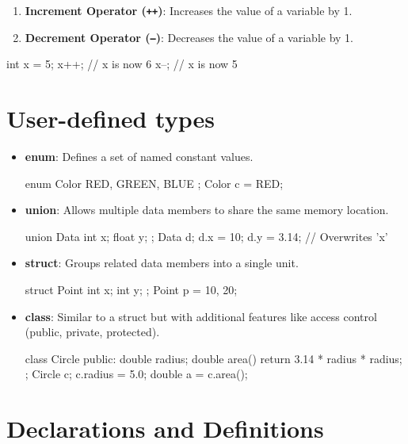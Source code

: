 \begin{enumerate}
    \item \textbf{Increment Operator (\texttt{++})}: Increases the value of a variable by 1.
    \item \textbf{Decrement Operator (\texttt{--})}: Decreases the value of a variable by 1.
\end{enumerate}

\begin{codeblock}[language=C++]
int x = 5;
x++; // x is now 6
x--; // x is now 5
\end{codeblock}

\section{User-defined types}

\begin{itemize}
    \item \textbf{enum}: Defines a set of named constant values.
    \begin{codeblock}[language=C++]
enum Color { RED, GREEN, BLUE };
Color c = RED;
    \end{codeblock}
    \item \textbf{union}: Allows multiple data members to share the same memory location.
    \begin{codeblock}[language=C++]
union Data {
    int x;
    float y;
};
Data d;
d.x = 10;
d.y = 3.14; // Overwrites 'x'
    \end{codeblock}
    \item \textbf{struct}: Groups related data members into a single unit.
    \begin{codeblock}[language=C++]
struct Point {
    int x;
    int y;
};
Point p = {10, 20};
    \end{codeblock}
    \item \textbf{class}: Similar to a struct but with additional features like access control (public, private, protected).
    \begin{codeblock}[language=C++]
class Circle {
public:
    double radius;
    double area() {
        return 3.14 * radius * radius;
    }
};
Circle c;
c.radius = 5.0;
double a = c.area();
    \end{codeblock}
\end{itemize}



\section{Declarations and Definitions}

